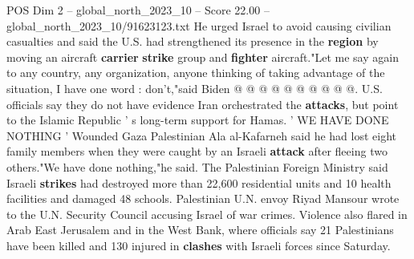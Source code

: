\begin{textsample}{POS Dim 2 – global\_north\_2023\_10 – Score 22.00 – global\_north\_2023\_10/91623123.txt}
He urged Israel to avoid causing civilian casualties and said the U.S. had strengthened its presence in the \textbf{region} by moving an aircraft \textbf{carrier} \textbf{strike} group and \textbf{fighter} aircraft."Let me say again to any country, any organization, anyone thinking of taking advantage of the situation, I have one word : don't,"said Biden @ @ @ @ @ @ @ @ @ @.
U.S. officials say they do not have evidence Iran orchestrated the \textbf{attacks}, but point to the Islamic Republic ' s long-term support for Hamas. ' WE HAVE DONE NOTHING ' Wounded Gaza Palestinian Ala al-Kafarneh said he had lost eight family members when they were caught by an Israeli \textbf{attack} after fleeing two others."We have done nothing,"he said.
The Palestinian Foreign Ministry said Israeli \textbf{strikes} had destroyed more than 22,600 residential units and 10 health facilities and damaged 48 schools.
Palestinian U.N. envoy Riyad Mansour wrote to the U.N.
Security Council accusing Israel of war crimes.
Violence also flared in Arab East Jerusalem and in the West Bank, where officials say 21 Palestinians have been killed and 130 injured in \textbf{clashes} with Israeli forces since Saturday.

\end{textsample}
